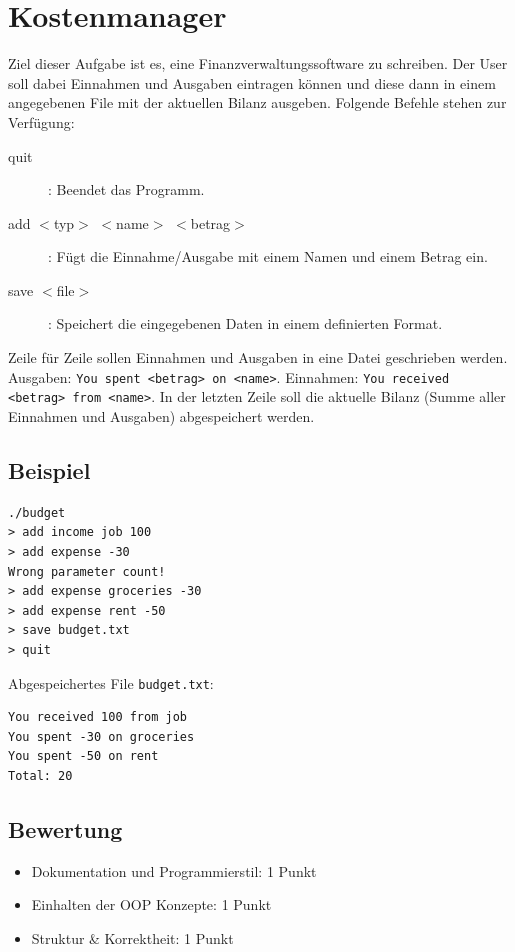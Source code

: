 \documentclass[a4paper,10pt]{article}
\begin{document}
\section*{Kostenmanager}

Ziel dieser Aufgabe ist es, eine Finanzverwaltungssoftware zu schreiben. Der User soll dabei Einnahmen und Ausgaben eintragen können und diese dann in einem angegebenen File mit der aktuellen Bilanz ausgeben. Folgende Befehle stehen zur Verfügung:
\begin{description}
 \item[quit]: Beendet das Programm.
 \item[add $<$typ$>$ $<$name$>$ $<$betrag$>$]: Fügt die Einnahme/Ausgabe mit einem Namen und einem Betrag ein.
 \item[save $<$file$>$]: Speichert die eingegebenen Daten in einem definierten Format.
\end{description}
Zeile für Zeile sollen Einnahmen und Ausgaben in eine Datei geschrieben werden.\newline
Ausgaben: \texttt{You spent <betrag> on <name>}.\newline
Einnahmen: \texttt{You received <betrag> from <name>}.\newline
In der letzten Zeile soll die aktuelle Bilanz (Summe aller Einnahmen und Ausgaben) abgespeichert werden.

\subsection*{Beispiel}
\footnotesize
\begin{verbatim}
./budget
> add income job 100
> add expense -30
Wrong parameter count!
> add expense groceries -30
> add expense rent -50
> save budget.txt
> quit
\end{verbatim}

Abgespeichertes File \texttt{budget.txt}:
\begin{lstlisting}[frame=single]
You received 100 from job
You spent -30 on groceries
You spent -50 on rent
Total: 20
\end{lstlisting}

\subsection*{Bewertung}
\begin{itemize}
 \item Dokumentation und Programmierstil: 1 Punkt
 \item Einhalten der OOP Konzepte: 1 Punkt
 \item Struktur \& Korrektheit: 1 Punkt
\end{itemize}
\newpage
\end{document}

